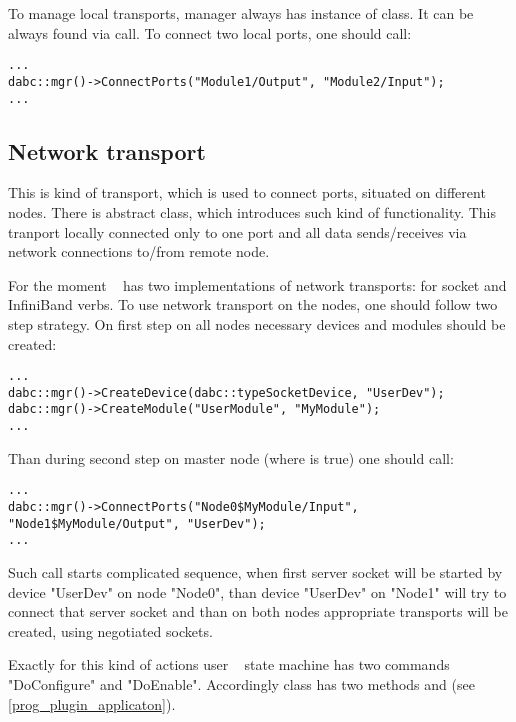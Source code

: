 To manage local transports, manager always has instance of  class.
It can be always found via  call. 
To connect two local ports, one should call:
\begin{small}
\begin{verbatim}
...
dabc::mgr()->ConnectPorts("Module1/Output", "Module2/Input");
...
\end{verbatim}     
\end{small}


\subsection{Network transport}

This is kind of transport, which is used to connect ports, situated on different nodes.
There is abstract  class, which introduces such kind of 
functionality. This tranport locally connected only to one port and all data
sends/receives via network connections to/from remote node. 

For the moment \dabc~ has two implementations of network transports: 
for socket and InfiniBand verbs.
To use network transport on the nodes, one should follow two step strategy. 
On first step on all nodes necessary devices and modules should be created:
\begin{small}
\begin{verbatim}
...
dabc::mgr()->CreateDevice(dabc::typeSocketDevice, "UserDev");
dabc::mgr()->CreateModule("UserModule", "MyModule");
...
\end{verbatim}     
\end{small}

Than during second step on master node 
(where  is true)  
one should call:
\begin{small}
\begin{verbatim}
...
dabc::mgr()->ConnectPorts("Node0$MyModule/Input", "Node1$MyModule/Output", "UserDev");
...
\end{verbatim}     
\end{small}
 
Such call starts complicated sequence, when first server socket will be started by device "UserDev" on node "Node0",
than device "UserDev" on "Node1" will try to connect that server socket and than on both nodes appropriate
transports will be created, using negotiated sockets. 

Exactly for this kind of actions user \dabc~ state machine has 
two commands "DoConfigure" and "DoEnable". Accordingly class
 has two methods  and 
 (see \ref{prog_plugin_applicaton}).  



